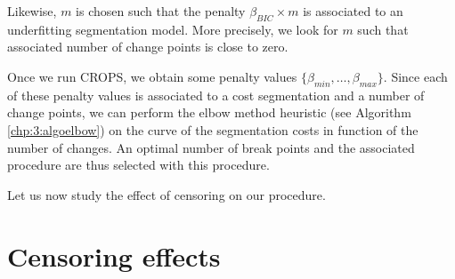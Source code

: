 Likewise, $m$ is chosen such that the penalty $\beta_{BIC}\times m$ is associated to an underfitting segmentation model. More precisely, we look for $m$ such that associated number of change points is close to zero.     

Once we run CROPS, we obtain some penalty values $\{\beta_{min},\dots,\beta_{max}\}$. Since each of these penalty values is associated to a cost segmentation and a number of change points, we can perform the elbow method heuristic (see Algorithm \ref{chp:3:algoelbow}) on the curve of the segmentation costs in function of the number of changes. An optimal number of break points and the associated procedure are thus selected with this procedure.

Let us now study the effect of censoring on our procedure.

\section{Censoring effects}\label{chp:4:2}

%

